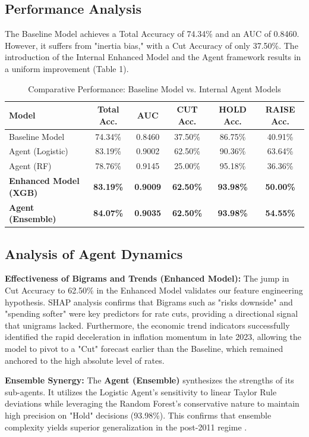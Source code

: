 \documentclass[11pt, a4paper]{article}
\begin{document}
\subsection{Performance Analysis}
The Baseline Model achieves a Total Accuracy of 74.34\% and an AUC of 0.8460. However, it suffers from "inertia bias," with a Cut Accuracy of only 37.50\%.
The introduction of the Internal Enhanced Model and the Agent framework results in a uniform improvement (Table 1).

\begin{table}[htbp]
\centering
\caption{Comparative Performance: Baseline Model vs. Internal Agent Models}
\label{tab:performance}
\begin{tabular}{lccccc}
\toprule
\textbf{Model} & \textbf{Total Acc.} & \textbf{AUC} & \textbf{CUT Acc.} & \textbf{HOLD Acc.} & \textbf{RAISE Acc.} \\
\midrule
Baseline Model & 74.34\% & 0.8460 & 37.50\% & 86.75\% & 40.91\% \\
Agent (Logistic) & 83.19\% & 0.9002 & 62.50\% & 90.36\% & 63.64\% \\
Agent (RF) & 78.76\% & 0.9145 & 25.00\% & 95.18\% & 36.36\% \\
\textbf{Enhanced Model (XGB)} & \textbf{83.19\%} & \textbf{0.9009} & \textbf{62.50\%} & \textbf{93.98\%} & \textbf{50.00\%} \\
\textbf{Agent (Ensemble)} & \textbf{84.07\%} & \textbf{0.9035} & \textbf{62.50\%} & \textbf{93.98\%} & \textbf{54.55\%} \\
\bottomrule
\end{tabular}
\end{table}

\subsection{Analysis of Agent Dynamics}
\textbf{Effectiveness of Bigrams and Trends (Enhanced Model):}
The jump in Cut Accuracy to 62.50\% in the Enhanced Model validates our feature engineering hypothesis. SHAP analysis confirms that Bigrams such as "risks downside" and "spending softer" were key predictors for rate cuts, providing a directional signal that unigrams lacked. Furthermore, the economic trend indicators successfully identified the rapid deceleration in inflation momentum in late 2023, allowing the model to pivot to a "Cut" forecast earlier than the Baseline, which remained anchored to the high absolute level of rates.

\textbf{Ensemble Synergy:}
The \textbf{Agent (Ensemble)} synthesizes the strengths of its sub-agents. It utilizes the Logistic Agent's sensitivity to linear Taylor Rule deviations while leveraging the Random Forest's conservative nature to maintain high precision on "Hold" decisions (93.98\%). This confirms that ensemble complexity yields superior generalization in the post-2011 regime \cite{ref13}.
\end{document}
